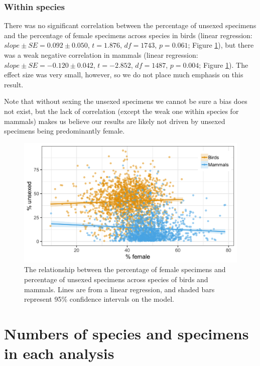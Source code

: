 \documentclass[a4paper, 12pt]{article}
\begin{document}
\subsubsection*{Within species}
There was no significant correlation between the percentage of unsexed specimens and the percentage of female specimens across species in birds (linear regression: $slope \pm SE = 0.092 \pm 0.050$, $t = 1.876$, $df = 1743$, $p = 0.061$; Figure \ref{fig-nosex-correlation2}), but there was a weak negative correlation in mammals (linear regression: $slope \pm SE = -0.120 \pm 0.042$, $t = -2.852$, $df = 1487$, $p = 0.004$; Figure \ref{fig-nosex-correlation2}). 
The effect size was very small, however, so we do not place much emphasis on this result.

Note that without sexing the unsexed specimens we cannot be sure a bias does not exist, but the lack of correlation (except the weak one within species for mammals) makes us believe our results are likely not driven by unsexed specimens being predominantly female.

\begin{figure}[H]
 \centering
  \includegraphics[width = \linewidth]{figures/nosex-binomial-correlation.png}
  \caption{The relationship between the percentage of female specimens and percentage of unsexed specimens across species of birds and mammals.
  Lines are from a linear regression, and shaded bars represent 95\% confidence intervals on the model.}
  \label{fig-nosex-correlation2}
\end{figure}

\newpage
\section{Numbers of species and specimens in each analysis}
\end{document}
